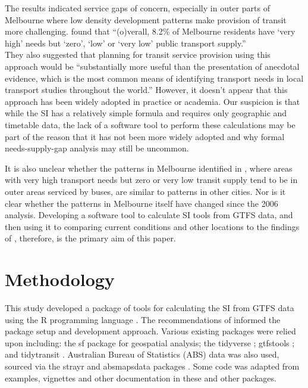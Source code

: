 \documentclass[preprint, 3p,
authoryear]{elsarticle} %
\begin{document}
The results indicated service gaps of concern, especially in outer parts
of Melbourne where low density development patterns make provision of
transit more challenging. \citet{currie2010identifying} found that
``(o)verall, 8.2\% of Melbourne residents have `very high' needs but
`zero', `low' or `very low' public transport supply.''\\
They also suggested that planning for transit service provision using
this approach would be ``substantially more useful than the presentation
of anecdotal evidence, which is the most common means of identifying
transport needs in local transport studies throughout the world.''
However, it doesn't appear that this approach has been widely adopted in
practice or academia. Our suspicion is that while the SI has a
relatively simple formula and requires only geographic and timetable
data, the lack of a software tool to perform these calculations may be
part of the reason that it has not been more widely adopted and why
formal needs-supply-gap analysis may still be uncommon.

It is also unclear whether the patterns in Melbourne identified in
\citet{currie2010identifying}, where areas with very high transport
needs but zero or very low transit supply tend to be in outer areas
serviced by buses, are similar to patterns in other cities. Nor is it
clear whether the patterns in Melbourne itself have changed since the
2006 analysis. Developing a software tool to calculate SI tools from
GTFS data, and then using it to comparing current conditions and other
locations to the findings of \citet{currie2010identifying}, therefore,
is the primary aim of this paper.

\hypertarget{methodology}{%
\section{Methodology}\label{methodology}}

This study developed a package of tools for calculating the SI from GTFS
data using the R programming language \citep{R-base}. The
recommendations of \citet{wickham2023r} informed the package setup and
development approach. Various existing packages were relied upon
including: the sf package \citep{R-sf} for geospatial analysis; the
tidyverse \citep{tidyverse2019}; gtfstools \citep{R-gtfstools}; and
tidytransit \citep{R-tidytransit}. Australian Bureau of Statistics (ABS)
data was also used, sourced via the strayr and absmapsdata packages
\citep{r-strayr}. Some code was adapted from examples, vignettes and
other documentation in these and other packages.
\end{document}
